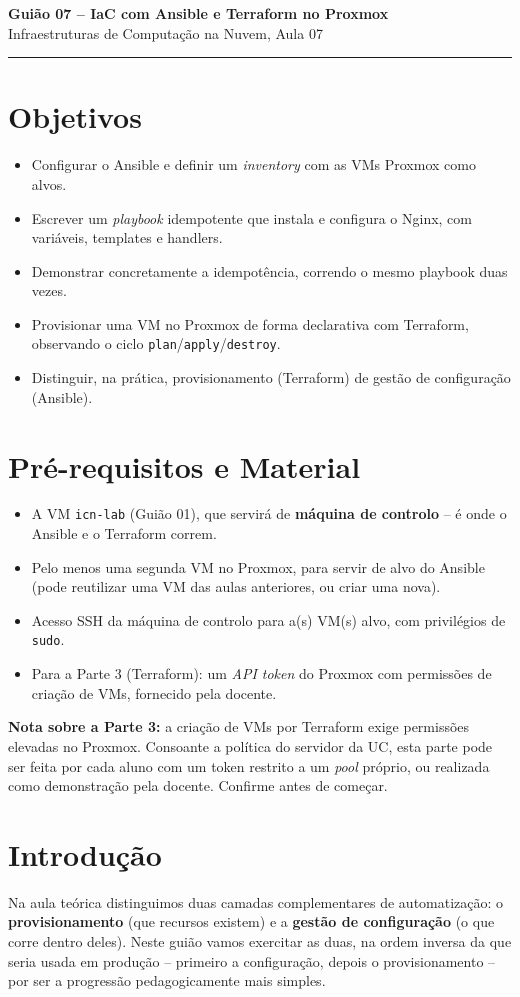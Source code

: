 \documentclass[11pt,a4paper]{article}
\newcommand{\guiaotitle}[2]{%
  \begin{center}
  {\Large\bfseries\color{TextEspresso} #1}\\[0.3cm]
  {\normalsize\color{NudeTaupe} #2}\\[0.2cm]
  {\color{NudeTaupe}\rule{4cm}{0.5pt}}
  \end{center}
  \vspace{0.5cm}
}
\begin{document}
\guiaotitle{Guião 07 -- IaC com Ansible e Terraform no Proxmox}{Infraestruturas de Computação na Nuvem, Aula 07}

\section{Objetivos}
\begin{itemize}[itemsep=0.2cm]
  \item Configurar o Ansible e definir um \emph{inventory} com as VMs Proxmox como alvos.
  \item Escrever um \emph{playbook} idempotente que instala e configura o Nginx, com variáveis, templates e handlers.
  \item Demonstrar concretamente a idempotência, correndo o mesmo playbook duas vezes.
  \item Provisionar uma VM no Proxmox de forma declarativa com Terraform, observando o ciclo \texttt{plan}/\texttt{apply}/\texttt{destroy}.
  \item Distinguir, na prática, provisionamento (Terraform) de gestão de configuração (Ansible).
\end{itemize}

\section{Pré-requisitos e Material}
\begin{itemize}[itemsep=0.2cm]
  \item A VM \texttt{icn-lab} (Guião 01), que servirá de \textbf{máquina de controlo} -- é onde o Ansible e o Terraform correm.
  \item Pelo menos uma segunda VM no Proxmox, para servir de alvo do Ansible (pode reutilizar uma VM das aulas anteriores, ou criar uma nova).
  \item Acesso SSH da máquina de controlo para a(s) VM(s) alvo, com privilégios de \texttt{sudo}.
  \item Para a Parte 3 (Terraform): um \emph{API token} do Proxmox com permissões de criação de VMs, fornecido pela docente.
\end{itemize}

\textbf{Nota sobre a Parte 3:} a criação de VMs por Terraform exige permissões elevadas no Proxmox. Consoante a política do servidor da UC, esta parte pode ser feita por cada aluno com um token restrito a um \emph{pool} próprio, ou realizada como demonstração pela docente. Confirme antes de começar.

\section{Introdução}
Na aula teórica distinguimos duas camadas complementares de automatização: o \textbf{provisionamento} (que recursos existem) e a \textbf{gestão de configuração} (o que corre dentro deles). Neste guião vamos exercitar as duas, na ordem inversa da que seria usada em produção -- primeiro a configuração, depois o provisionamento -- por ser a progressão pedagogicamente mais simples.
\end{document}
